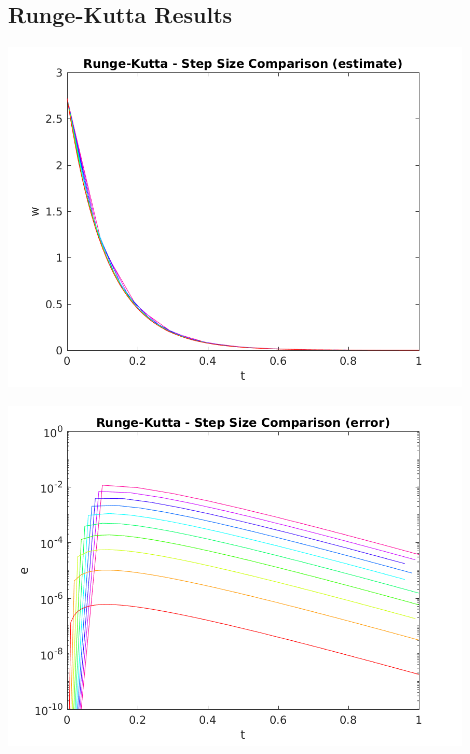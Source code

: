 \documentclass{article}
\begin{document}
\subsection{Runge-Kutta Results}
\label{results:rk}

\begin{center}
  \includegraphics[width=0.9\textwidth]{../output/a_rk_h_val.png}
  \label{fig:a_rk_h_val}
\end{center}

\begin{center}
  \includegraphics[width=0.9\textwidth]{../output/a_rk_h_err.png}
  \label{fig:a_rk_h_err}
\end{center}
\end{document}
